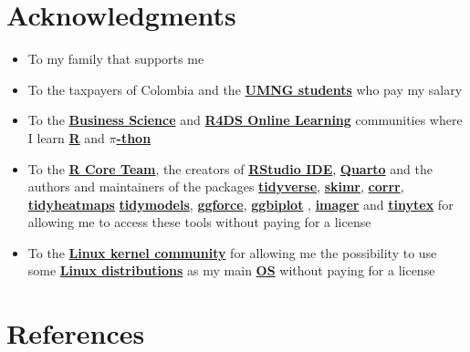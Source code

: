 \documentclass[
  ignorenonframetext,
]{beamer}
\begin{document}
\section{Acknowledgments}\label{acknowledgments}

\begin{frame}{}
\label{section-46}
\begin{itemize}
\item
  To my family that supports me
\item
  To the taxpayers of Colombia and the
  \href{https://www.umng.edu.co/estudiante}{\textbf{UMNG students}} who
  pay my salary
\item
  To the \href{https://www.business-science.io/}{\textbf{Business
  Science}} and \href{https://www.rfordatasci.com/}{\textbf{R4DS Online
  Learning}} communities where I learn
  \href{https://www.r-project.org/about.html}{\textbf{R}} and
  \href{https://www.python.org/about/}{\textbf{\(\pi\)-thon}}
\item
  To the \href{https://www.r-project.org/contributors.html}{\textbf{R
  Core Team}}, the creators of
  \href{https://posit.co/products/open-source/rstudio/}{\textbf{RStudio
  IDE}}, \href{https://quarto.org/}{\textbf{Quarto}} and the authors and
  maintainers of the packages
  \href{https://CRAN.R-project.org/package=tidyverse}{\textbf{tidyverse}},
  \href{https://CRAN.R-project.org/package=skimr}{\textbf{skimr}},
  \href{https://CRAN.R-project.org/package=corrr}{\textbf{corrr}},
  \href{https://CRAN.R-project.org/package=tidyheatmaps}{\textbf{tidyheatmaps}}
  \href{https://CRAN.R-project.org/package=tidymodels}{\textbf{tidymodels}},
  \href{https://CRAN.R-project.org/package=ggforce}{\textbf{ggforce}},
  \href{https://CRAN.R-project.org/package=ggbiplot}{\textbf{ggbiplot}}
  , \href{https://CRAN.R-project.org/package=imager}{\textbf{imager}}
  and
  \href{https://CRAN.R-project.org/package=tinytex}{\textbf{tinytex}}
  for allowing me to access these tools without paying for a license
\item
  To the \href{https://www.kernel.org/category/about.html}{\textbf{Linux
  kernel community}} for allowing me the possibility to use some
  \href{https://static.lwn.net/Distributions/}{\textbf{Linux
  distributions}} as my main
  \href{https://en.wikipedia.org/wiki/Operating_system}{\textbf{OS}}
  without paying for a license
\end{itemize}
\end{frame}

\section*{References}\label{references}
\end{document}
